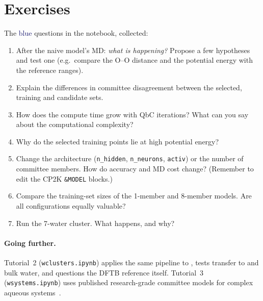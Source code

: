\documentclass[11pt,a4paper]{article}
\begin{document}
\section{Exercises}
The \textcolor{MidnightBlue}{blue} questions in the notebook, collected:
\begin{enumerate}
  \item After the naive model's MD: \emph{what is happening?} Propose a few
        hypotheses and test one (e.g.\ compare the O--O distance and the
        potential energy with the reference ranges).
  \item Explain the differences in committee disagreement between the
        selected, training and candidate sets.
  \item How does the compute time grow with QbC iterations? What can you say
        about the computational complexity?
  \item Why do the selected training points lie at high potential energy?
  \item Change the architecture (\texttt{n\_hidden}, \texttt{n\_neurons},
        \texttt{activ}) or the number of committee members. How do accuracy and
        MD cost change? (Remember to edit the CP2K \texttt{\&MODEL} blocks.)
  \item Compare the training-set sizes of the 1-member and 8-member models.
        Are all configurations equally valuable?
  \item Run the 7-water cluster. What happens, and why?
\end{enumerate}

\paragraph{Going further.} Tutorial~2 (\texttt{wclusters.ipynb}) applies the
same pipeline to , tests transfer to  and bulk
water, and questions the DFTB reference itself. Tutorial~3
(\texttt{wsystems.ipynb}) uses published research-grade committee models
for complex aqueous systems~\cite{Schran2021}.
\end{document}
